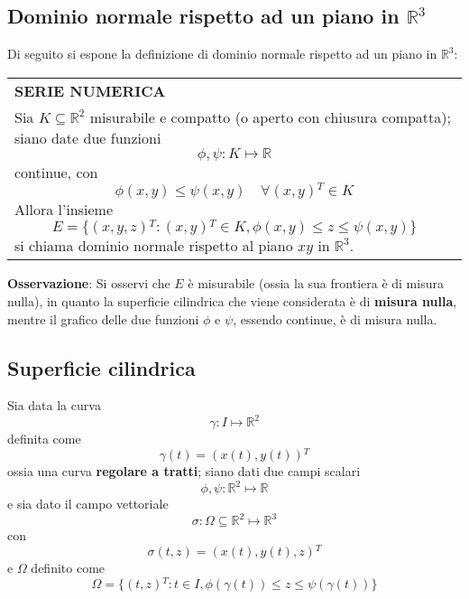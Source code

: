 \documentclass[a4paper]{extarticle}
\renewcommand\arraystretch{}
\begin{document}
\vspace{1em}
\noindent
\subsection{Dominio normale rispetto ad un piano in $\mathbb{R}^3$}
Di seguito si espone la definizione di dominio normale rispetto ad un piano in $\mathbb{R}^3$:

\vspace{1em}
\setlength{\tabcolsep}{14pt}
\renewcommand{\arraystretch}{2}
\noindent
\begin{tabularx}{\textwidth}{@{}|P|@{}}
    \hline
    {\textbf{SERIE NUMERICA}}\\
    \parbox{\linewidth}{Sia $K \subseteq \mathbb{R}^2$ misurabile e compatto (o aperto con chiusura compatta); siano date due funzioni
    \[\phi,\psi : K \longmapsto \mathbb{R}\]
    continue, con
    \[\phi(x,y) \leq \psi(x,y) \hspace{1em} \forall (x,y){^T} \in K\]
    Allora l'insieme
    \[E = \{(x,y,z){^T} : (x,y){^T} \in K, \phi(x,y) \leq z \leq \psi(x,y)\}\]
    si chiama dominio normale rispetto al piano $xy$ in $\mathbb{R}^3$.
    \vspace{3mm}}\\
    \hline
\end{tabularx}

\vspace{2em}
\noindent
\textbf{Osservazione}: Si osservi che $E$ è misurabile (ossia la sua frontiera è di misura nulla), in quanto la superficie cilindrica che viene considerata è di \textbf{misura nulla}, mentre il grafico delle due funzioni $\phi$ e $\psi$, essendo continue, è di misura nulla.

\vspace{1em}
\noindent
\subsection{Superficie cilindrica}
Sia data la curva
\[\gamma : I \longmapsto \mathbb{R}^2\]
definita come
\[\gamma(t) = (x(t),y(t)){^T}\]
ossia una curva \textbf{regolare a tratti}; siano dati due campi scalari
\[\phi,\psi : \mathbb{R}^2 \longmapsto \mathbb{R}\]
e sia dato il campo vettoriale
\[\sigma : \Omega \subseteq \mathbb{R}^2 \longmapsto \mathbb{R}^3\]
con
\[\sigma(t,z) = (x(t),y(t),z){^T}\]
e $\Omega$ definito come
\[\Omega = \{(t,z){^T} : t \in I, \phi(\gamma(t)) \leq z \leq \psi(\gamma(t))\}\]
\end{document}
